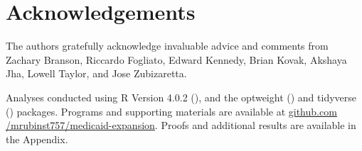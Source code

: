 \documentclass[aoas]{imsart}
\theoremstyle{plain}
\theoremstyle{remark}
\begin{document}
\section*{Acknowledgements}

The authors gratefully acknowledge invaluable advice and comments from Zachary Branson, Riccardo Fogliato, Edward Kennedy, Brian Kovak, Akshaya Jha, Lowell Taylor, and Jose Zubizaretta.

\begin{supplement}
Analyses conducted using R Version 4.0.2 (\cite{r}), and the optweight (\cite{optweight}) and tidyverse (\cite{tidyverse}) packages. Programs and supporting materials are available at \url{github.com /mrubinst757/medicaid-expansion}. Proofs and additional results are available in the Appendix. 
\end{supplement}


\clearpage

\appendix



\clearpage



\clearpage



\clearpage



\clearpage



\clearpage


\end{document}
